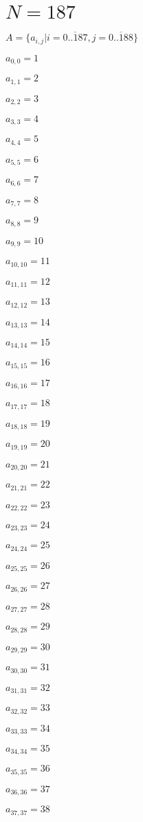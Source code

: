 \documentclass[a4paper,12pt]{article}
\begin{document}
\section{ $N = 187$ }
$A = \{ a _{ i, j } | i = \overline { 0..187 }, j = \overline { 0..188 } \}$

$a _{ 0, 0 } = 1$

$a _{ 1, 1 } = 2$

$a _{ 2, 2 } = 3$

$a _{ 3, 3 } = 4$

$a _{ 4, 4 } = 5$

$a _{ 5, 5 } = 6$

$a _{ 6, 6 } = 7$

$a _{ 7, 7 } = 8$

$a _{ 8, 8 } = 9$

$a _{ 9, 9 } = 10$

$a _{ 10, 10 } = 11$

$a _{ 11, 11 } = 12$

$a _{ 12, 12 } = 13$

$a _{ 13, 13 } = 14$

$a _{ 14, 14 } = 15$

$a _{ 15, 15 } = 16$

$a _{ 16, 16 } = 17$

$a _{ 17, 17 } = 18$

$a _{ 18, 18 } = 19$

$a _{ 19, 19 } = 20$

$a _{ 20, 20 } = 21$

$a _{ 21, 21 } = 22$

$a _{ 22, 22 } = 23$

$a _{ 23, 23 } = 24$

$a _{ 24, 24 } = 25$

$a _{ 25, 25 } = 26$

$a _{ 26, 26 } = 27$

$a _{ 27, 27 } = 28$

$a _{ 28, 28 } = 29$

$a _{ 29, 29 } = 30$

$a _{ 30, 30 } = 31$

$a _{ 31, 31 } = 32$

$a _{ 32, 32 } = 33$

$a _{ 33, 33 } = 34$

$a _{ 34, 34 } = 35$

$a _{ 35, 35 } = 36$

$a _{ 36, 36 } = 37$

$a _{ 37, 37 } = 38$
\end{document}
